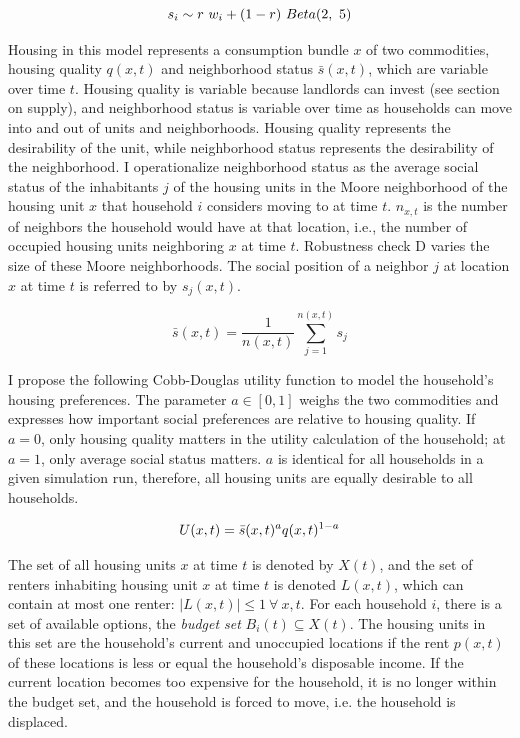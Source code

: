 \begin{equation}
 s_i \sim r \ w_i \\ + \\ (1 - r) \ Beta(2, \ 5)
\end{equation}
\label{eq:soc}

Housing in this model represents a consumption bundle $x$ of two commodities, housing quality $q(x, t)$ and neighborhood status $\bar{s}(x, t)$, which are variable over time $t$. Housing quality is variable because landlords can invest (see section on supply), and neighborhood status is variable over time as households can move into and out of units and neighborhoods. Housing quality represents the desirability of the unit, while neighborhood status represents the desirability of the neighborhood. I operationalize neighborhood status as the average social status of the inhabitants $j$ of the housing units in the Moore neighborhood of the housing unit $x$ that household $i$ considers moving to at time $t$. $n_{x, t}$ is the number of neighbors the household would have at that location, i.e., the number of occupied housing units neighboring $x$ at time $t$. Robustness check D varies the size of these Moore neighborhoods. The social position of a neighbor $j$ at location $x$ at time $t$ is referred to by $s_{j}(x, t)$. 

\begin{equation}
 \bar{s}(x, t) = \frac{1}{n(x, t)} \sum_{j = 1}^{n(x, t)} s_{j}
\end{equation}
\label{eq:status}

I propose the following Cobb-Douglas utility function to model the household's housing preferences. The parameter $a \in [0, 1]$ weighs the two commodities and expresses how important social preferences are relative to housing quality. If $a = 0$, only housing quality matters in the utility calculation of the household; at $a = 1$, only average social status matters. $a$ is identical for all households in a given simulation run, therefore, all housing units are equally desirable to all households.

\begin{equation}
 U(x, t) = \\ \bar{s}(x, t)^a \\ q(x, t)^{1-a}
\end{equation}
\label{eq:util}

The set of all housing units $x$ at time $t$ is denoted by $X(t)$, and the set of renters inhabiting housing unit $x$ at time $t$ is denoted $L(x, t)$, which can contain at most one renter: $|L(x, t)| \leq 1 \ \forall \ x, t$. For each household $i$, there is a set of available options, the \textit{budget set} $B_i(t) \subseteq X(t)$. The housing units in this set are the household's current and unoccupied locations if the rent $p(x, t)$ of these locations is less or equal the household's disposable income. If the current location becomes too expensive for the household, it is no longer within the budget set, and the household is forced to move, i.e. the household is displaced. 


